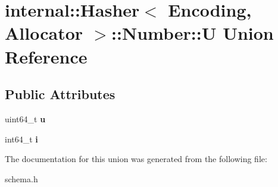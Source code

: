 \hypertarget{a02376}{}\section{internal\+:\+:Hasher$<$ Encoding, Allocator $>$\+:\+:Number\+:\+:U Union Reference}
\label{a02376}
\subsection*{Public Attributes}
\begin{DoxyCompactItemize}
\item 
\mbox{\label{a02376_a6380a48b72a4bb5dd7291d47814e6421}} 
uint64\+\_\+t {\bfseries u}
\item 
\mbox{\label{a02376_a19099b91768e67f02ed5a27fc157974b}} 
int64\+\_\+t {\bfseries i}
\end{DoxyCompactItemize}


The documentation for this union was generated from the following file\+:\begin{DoxyCompactItemize}
\item 
schema.\+h\end{DoxyCompactItemize}

